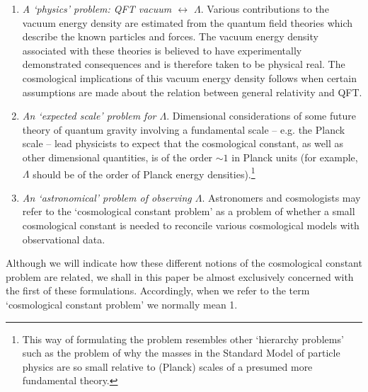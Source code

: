 \documentclass[12pt]{article}
\begin{document}
\begin{enumerate}
\item {\em A `physics' problem: QFT vacuum  $\leftrightarrow$ $\Lambda$}. 
Various contributions to the vacuum energy density are estimated from the
quantum field theories which describe the known particles and
forces. The vacuum energy density associated with these theories is
believed to have experimentally demonstrated consequences and is
therefore taken to be physical real. The cosmological implications
of this vacuum energy density follows when certain assumptions are made about the
relation between general relativity and QFT.

\item {\em An `expected scale' problem for $\Lambda$}. 
Dimensional considerations of some future theory of quantum gravity
involving a fundamental scale -- e.g. the Planck scale -- lead physicists
to expect that the cosmological constant, as well as other dimensional
quantities, is of the order $\sim 1$ in Planck units (for example,
$\Lambda$ should be of the order of Planck energy
densities).\footnote{This way of formulating the problem resembles
other `hierarchy problems' such as the problem of why the masses in the
Standard Model of particle physics are so small relative to (Planck) 
scales of a presumed more fundamental theory.}

\item {\em An `astronomical' problem of observing $\Lambda$}.
Astronomers and cosmologists may refer to the `cosmological
constant problem' as a problem of whether a small cosmological
constant is needed to reconcile various cosmological models with 
observational data. 

\end{enumerate}

\noindent
Although we will indicate how these different notions of the
cosmological constant problem are related, we shall in this paper be
almost exclusively concerned with the first of these
formulations. Accordingly, when we refer to the term `cosmological
constant problem' we normally mean 1.
\end{document}
